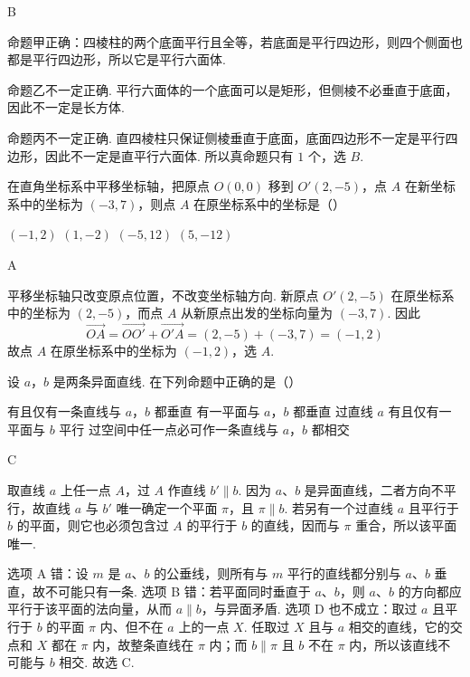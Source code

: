 \documentclass[UTF8,a4paper,oneside,11pt]{ctexbook}
\begin{document}
\begin{answer}
B
\end{answer}

\begin{solution}
命题甲正确：四棱柱的两个底面平行且全等，若底面是平行四边形，则四个侧面也都是平行四边形，所以它是平行六面体.

命题乙不一定正确. 平行六面体的一个底面可以是矩形，但侧棱不必垂直于底面，因此不一定是长方体.

命题丙不一定正确. 直四棱柱只保证侧棱垂直于底面，底面四边形不一定是平行四边形，因此不一定是直平行六面体. 所以真命题只有 \(1\) 个，选 \(B\).
\end{solution}

\begin{problem}
在直角坐标系中平移坐标轴，把原点 \(O(0,0)\) 移到 \(O'(2,-5)\)，点 \(A\) 在新坐标系中的坐标为 \((-3,7)\)，则点 \(A\) 在原坐标系中的坐标是（\quad）

\choices
    {\((-1,2)\)}
    {\((1,-2)\)}
    {\((-5,12)\)}
    {\((5,-12)\)}
\end{problem}

\begin{answer}
A
\end{answer}

\begin{solution}
平移坐标轴只改变原点位置，不改变坐标轴方向. 新原点 \(O'(2,-5)\) 在原坐标系中的坐标为 \((2,-5)\)，而点 \(A\) 从新原点出发的坐标向量为 \((-3,7)\). 因此
\[
\overrightarrow{OA}=\overrightarrow{OO'}+\overrightarrow{O'A}=(2,-5)+(-3,7)=(-1,2)
\]
故点 \(A\) 在原坐标系中的坐标为 \((-1,2)\)，选 \(A\).
\end{solution}

\begin{problem}
设 \(a\)，\(b\) 是两条异面直线. 在下列命题中正确的是（\quad）

\choices
    {有且仅有一条直线与 \(a\)，\(b\) 都垂直}
    {有一平面与 \(a\)，\(b\) 都垂直}
    {过直线 \(a\) 有且仅有一平面与 \(b\) 平行}
    {过空间中任一点必可作一条直线与 \(a\)，\(b\) 都相交}
\end{problem}

\begin{answer}
C
\end{answer}

\begin{solution}
取直线 \(a\) 上任一点 \(A\)，过 \(A\) 作直线 \(b'\parallel b\). 因为 \(a\)、\(b\) 是异面直线，二者方向不平行，故直线 \(a\) 与 \(b'\) 唯一确定一个平面 \(\pi\)，且 \(\pi\parallel b\). 若另有一个过直线 \(a\) 且平行于 \(b\) 的平面，则它也必须包含过 \(A\) 的平行于 \(b\) 的直线，因而与 \(\pi\) 重合，所以该平面唯一.

选项 A 错：设 \(m\) 是 \(a\)、\(b\) 的公垂线，则所有与 \(m\) 平行的直线都分别与 \(a\)、\(b\) 垂直，故不可能只有一条. 选项 B 错：若平面同时垂直于 \(a\)、\(b\)，则 \(a\)、\(b\) 的方向都应平行于该平面的法向量，从而 \(a\parallel b\)，与异面矛盾. 选项 D 也不成立：取过 \(a\) 且平行于 \(b\) 的平面 \(\pi\) 内、但不在 \(a\) 上的一点 \(X\). 任取过 \(X\) 且与 \(a\) 相交的直线，它的交点和 \(X\) 都在 \(\pi\) 内，故整条直线在 \(\pi\) 内；而 \(b\parallel\pi\) 且 \(b\) 不在 \(\pi\) 内，所以该直线不可能与 \(b\) 相交. 故选 C.
\end{solution}
\end{document}
